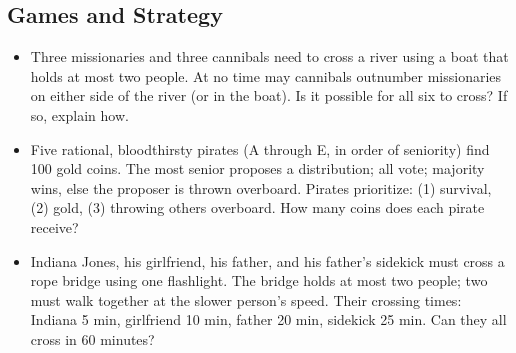 \documentclass[12pt]{article}
\begin{document}
\subsection{Games and Strategy}
\begin{itemize}
  \item Three missionaries and three cannibals need to cross a river using a boat that holds at most two people. At no time may cannibals outnumber missionaries on either side of the river (or in the boat). Is it possible for all six to cross? If so, explain how.

  \item Five rational, bloodthirsty pirates (A through E, in order of seniority) find 100 gold coins. The most senior proposes a distribution; all vote; majority wins, else the proposer is thrown overboard. Pirates prioritize: (1) survival, (2) gold, (3) throwing others overboard. How many coins does each pirate receive?

  \item Indiana Jones, his girlfriend, his father, and his father's sidekick must cross a rope bridge using one flashlight. The bridge holds at most two people; two must walk together at the slower person's speed. Their crossing times: Indiana 5 min, girlfriend 10 min, father 20 min, sidekick 25 min. Can they all cross in 60 minutes?
\end{itemize}
\end{document}
